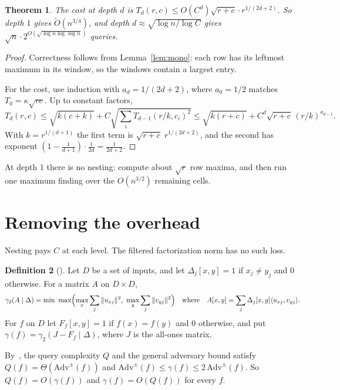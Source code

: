 \documentclass[11pt]{article}
\newtheorem{theorem}{Theorem}[section]
\theoremstyle{definition}
\newtheorem{definition}[theorem]{Definition}
\theoremstyle{remark}
\newcommand{\Ot}{\tilde O}
\newcommand{\inner}[2]{\langle #1,#2\rangle}
\begin{document}
\begin{theorem}\label{thm:nested}
The cost at depth $d$ is $T_d(r,c)\le O(C^d)\sqrt{r+c}\cdot r^{1/(2d+2)}$. So depth $1$ gives $\Ot(n^{3/4})$, and depth $d\approx\sqrt{\log n/\log C}$ gives $\sqrt n\cdot 2^{O(\sqrt{\log n\log\log n})}$ queries.
\end{theorem}
\begin{proof}
Correctness follows from Lemma~\ref{lem:mono}: each row has its leftmost maximum in its window, so the windows contain a largest entry.

For the cost, use induction with $a_d=1/(2d+2)$, where $a_0=1/2$ matches $T_0=\kappa\sqrt{rc}$. Up to constant factors,
\[
T_d(r,c)\le\sqrt{k(c+k)}+C\sqrt{\sum_i T_{d-1}(r/k,c_i)^2}\le\sqrt{k(r+c)}+C^d\sqrt{r+c}\,(r/k)^{a_{d-1}}.
\]
With $k=r^{1/(d+1)}$ the first term is $\sqrt{r+c}\;r^{1/(2d+2)}$, and the second has exponent $(1-\frac1{d+1})\cdot\frac1{2d}=\frac1{2d+2}$.
\end{proof}

At depth $1$ there is no nesting: compute about $\sqrt r$ row maxima, and then run one maximum finding over the $O(n^{3/2})$ remaining cells.

\section{Removing the overhead}\label{sec:adv}

Nesting pays $C$ at each level. The filtered factorization norm has no such loss.

\begin{definition}[\cite{LMRSS11}]
Let $D$ be a set of inputs, and let $\Delta_j[x,y]=1$ if $x_j\ne y_j$ and $0$ otherwise. For a matrix $A$ on $D\times D$,
\[
\gamma_2(A\mid\Delta)=\min\ \max\Bigl(\max_x\sum_j\|u_{xj}\|^2,\ \max_y\sum_j\|v_{yj}\|^2\Bigr)\quad\text{where}\quad A[x,y]=\sum_j\Delta_j[x,y]\inner{u_{xj}}{v_{yj}}.
\]
For $f$ on $D$ let $F_f[x,y]=1$ if $f(x)=f(y)$ and $0$ otherwise, and put $\gamma(f)=\gamma_2(J-F_f\mid\Delta)$, where $J$ is the all-ones matrix.
\end{definition}

By~\cite{LMRSS11}, the query complexity $Q$ and the general adversary bound satisfy $Q(f)=\Theta(\mathrm{Adv}^\pm(f))$ and $\mathrm{Adv}^\pm(f)\le\gamma(f)\le 2\,\mathrm{Adv}^\pm(f)$. So $Q(f)=O(\gamma(f))$ and $\gamma(f)=O(Q(f))$ for every $f$.
\end{document}
